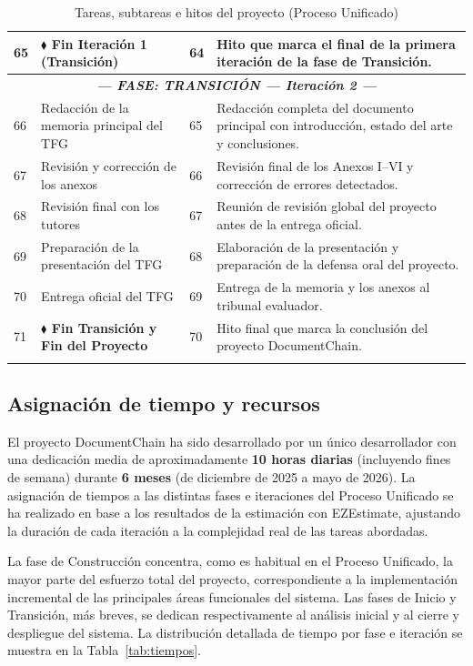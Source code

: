 \documentclass[11pt, a4paper]{article}
\begin{document}
\begin{longtable}{|p{1cm}|p{5.5cm}|p{1.5cm}|p{5.5cm}|}
\hline
65 & \textbf{$\blacklozenge$ Fin Iteración 1 (Transición)} & 64 & Hito que marca el final de la primera iteración de la fase de Transición. \\
\hline
\multicolumn{4}{|c|}{\textit{\textbf{--- FASE: TRANSICIÓN --- Iteración 2 ---}}} \\
\hline
66 & Redacción de la memoria principal del TFG & 65 & Redacción completa del documento principal con introducción, estado del arte y conclusiones. \\
\hline
67 & Revisión y corrección de los anexos & 66 & Revisión final de los Anexos I--VI y corrección de errores detectados. \\
\hline
68 & Revisión final con los tutores & 67 & Reunión de revisión global del proyecto antes de la entrega oficial. \\
\hline
69 & Preparación de la presentación del TFG & 68 & Elaboración de la presentación y preparación de la defensa oral del proyecto. \\
\hline
70 & Entrega oficial del TFG & 69 & Entrega de la memoria y los anexos al tribunal evaluador. \\
\hline
71 & \textbf{$\blacklozenge$ Fin Transición y Fin del Proyecto} & 70 & Hito final que marca la conclusión del proyecto DocumentChain. \\
\hline
\caption{Tareas, subtareas e hitos del proyecto (Proceso Unificado)}\label{tab:tareas-hitos}
\end{longtable}

\subsection{Asignación de tiempo y recursos}

El proyecto DocumentChain ha sido desarrollado por un único desarrollador con una dedicación media de aproximadamente \textbf{10 horas diarias} (incluyendo fines de semana) durante \textbf{6 meses} (de diciembre de 2025 a mayo de 2026). La asignación de tiempos a las distintas fases e iteraciones del Proceso Unificado se ha realizado en base a los resultados de la estimación con EZEstimate, ajustando la duración de cada iteración a la complejidad real de las tareas abordadas.

La fase de Construcción concentra, como es habitual en el Proceso Unificado, la mayor parte del esfuerzo total del proyecto, correspondiente a la implementación incremental de las principales áreas funcionales del sistema. Las fases de Inicio y Transición, más breves, se dedican respectivamente al análisis inicial y al cierre y despliegue del sistema. La distribución detallada de tiempo por fase e iteración se muestra en la Tabla~\ref{tab:tiempos}.
\end{document}
